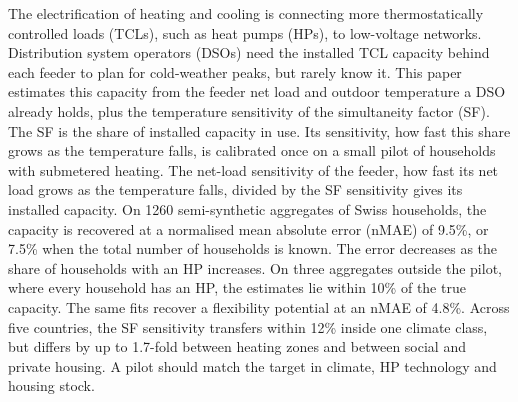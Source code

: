 The electrification of heating and cooling is connecting more thermostatically controlled loads (TCLs), such as heat pumps (HPs), to low-voltage networks. Distribution system operators (DSOs) need the installed TCL capacity behind each feeder to plan for cold-weather peaks, but rarely know it. This paper estimates this capacity from the feeder net load and outdoor temperature a DSO already holds, plus the temperature sensitivity of the simultaneity factor (SF). The SF is the share of installed capacity in use. Its sensitivity, how fast this share grows as the temperature falls, is calibrated once on a small pilot of households with submetered heating. The net-load sensitivity of the feeder, how fast its net load grows as the temperature falls, divided by the SF sensitivity gives its installed capacity. On 1260 semi-synthetic aggregates of Swiss households, the capacity is recovered at a normalised mean absolute error (nMAE) of 9.5\%, or 7.5\% when the total number of households is known. The error decreases as the share of households with an HP increases. On three aggregates outside the pilot, where every household has an HP, the estimates lie within 10\% of the true capacity. The same fits recover a flexibility potential at an nMAE of 4.8\%. Across five countries, the SF sensitivity transfers within 12\% inside one climate class, but differs by up to 1.7-fold between heating zones and between social and private housing. A pilot should match the target in climate, HP technology and housing stock.
